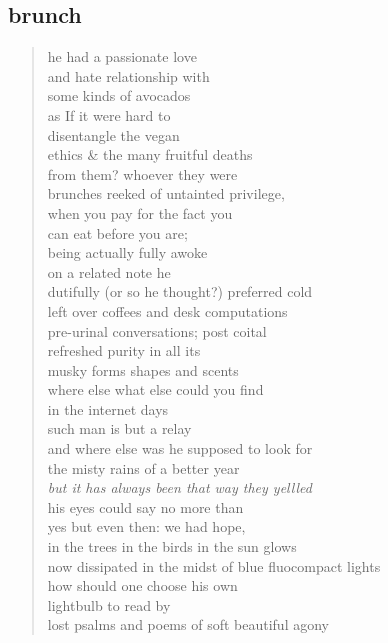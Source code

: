 \documentclass[11pt]{article}
\begin{document}
\subsection{brunch}
\label{sec:org07a7bf5}
\begin{verse}
he had a passionate love\\
and hate relationship with\\
some kinds of avocados\\
as If it were hard to\\
disentangle the vegan\\
ethics \& the many fruitful deaths\\
from them? whoever they were\\
brunches reeked of untainted privilege,\\
when you pay for the fact you\\
can eat before you are;\\
being actually fully awoke\\
\vspace*{1em}
on a related note he\\
dutifully (or so he thought?) preferred cold\\
left over coffees and desk computations\\
pre-urinal conversations; post coital\\
refreshed purity in all its\\
musky forms shapes and scents\\
where else what else could you find\\
in the internet days\\
such man is but a relay\\
and where else was he supposed to look for\\
the misty rains of a better year\\
\vspace*{1em}
\vspace*{1em}
\textit{but it has always been that way they yellled}\\
his eyes could say no more than\\
yes but even then: we had hope,\\
in the trees in the birds in the sun glows\\
now dissipated in the midst of blue fluocompact lights\\
how should one choose his own\\
lightbulb to read by\\
lost psalms and poems of soft beautiful agony\\
\end{verse}
\end{document}
